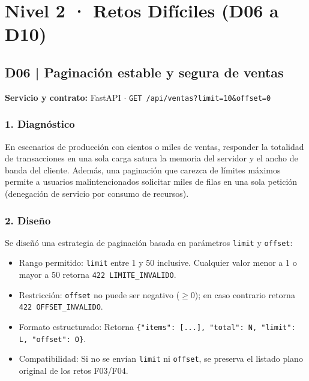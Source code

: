 \documentclass[11pt,a4paper]{article}
\begin{document}
\newpage

\section{Nivel 2 · Retos Difíciles (D06 a D10)}

\subsection{D06 | Paginación estable y segura de ventas}
\textbf{Servicio y contrato:} FastAPI $\cdot$ \texttt{GET /api/ventas?limit=10\&offset=0}

\subsubsection{1. Diagnóstico}
En escenarios de producción con cientos o miles de ventas, responder la totalidad de transacciones en una sola carga satura la memoria del servidor y el ancho de banda del cliente. Además, una paginación que carezca de límites máximos permite a usuarios malintencionados solicitar miles de filas en una sola petición (denegación de servicio por consumo de recursos).

\subsubsection{2. Diseño}
Se diseñó una estrategia de paginación basada en parámetros \texttt{limit} y \texttt{offset}:
\begin{itemize}
    \item Rango permitido: \texttt{limit} entre 1 y 50 inclusive. Cualquier valor menor a 1 o mayor a 50 retorna \texttt{422 LIMITE\_INVALIDO}.
    \item Restricción: \texttt{offset} no puede ser negativo ($\ge 0$); en caso contrario retorna \texttt{422 OFFSET\_INVALIDO}.
    \item Formato estructurado: Retorna \texttt{\{"items": [...], "total": N, "limit": L, "offset": O\}}.
    \item Compatibilidad: Si no se envían \texttt{limit} ni \texttt{offset}, se preserva el listado plano original de los retos F03/F04.
\end{itemize}
\end{document}
